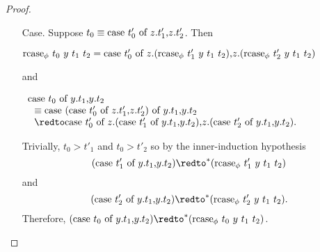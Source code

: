 \begin{proof}
\begin{itemize}
\begin{itemize}
    \item[Case.] Suppose $t_0 \equiv \mbox{case}\ t'_0\ \text{of}\ z\text{.}t'_1\text{,}z\text{.}t'_2$.  Then 
      \begin{center}
        \begin{math}
          \mbox{rcase}_{\phi}\ t_0\ y\ t_1\ t_2 = 
          \mbox{case}\ t'_0\ \text{of}\ z\text{.}(\mbox{rcase}_{\phi}\ t'_1\ y\ t_1\ t_2)\text{,}z\text{.}(\mbox{rcase}_{\phi}\ t'_2\ y\ t_1\ t_2)
        \end{math}
      \end{center}
      and
      \begin{center}
        \begin{math}
          \begin{array}{lll}
            \ccon{t_0}{y}{t_1}{t_2} \\
            \,\,\,\,\equiv  \ccon{(\ccon{t'_0}{z}{t'_1}{t'_2})}{y}{t_1}{t_2}\\
            \,\,\,\,\redto \ccon{t'_0}{z}{(\ccon{t'_1}{y}{t_1}{t_2})}{(\ccon{t'_2}{y}{t_1}{t_2})}.
          \end{array}
        \end{math}
      \end{center}
      Trivially, $t_0 > t'_1$ and $t_0 > t'_2$ so by the inner-induction hypothesis \\
      \[ (\ccon{t'_1}{y}{t_1}{t_2}) \redto^* (\rcase{\phi}{t'_1}{y}{t_1}{t_2})\] and 
      \[(\ccon{t'_2}{y}{t_1}{t_2}) \redto^* (\rcase{\phi}{t'_2}{y}{t_1}{t_2}).\]  Therefore,
      $(\ccon{t_0}{y}{t_1}{t_2}) \redto^* (\rcase{\phi}{t_0}{y}{t_1}{t_2})$.
    \end{itemize}
    

\end{itemize}
\end{proof}
